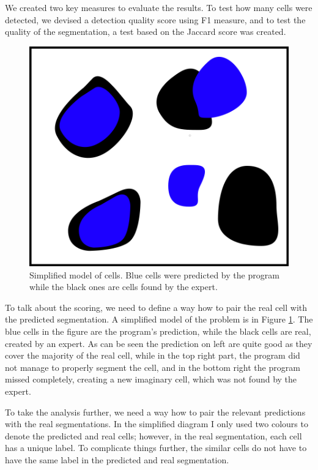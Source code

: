 \documentclass[
  digital,     %
  oneside,     %
  nosansbold,  %
  nocolorbold, %
  lof,         %
  lot,         %
]{fithesis4}
\begin{document}
We created two key measures to evaluate the results. To test how many cells were
detected, we devised a detection quality score using F1 measure, and to test the
quality of the segmentation, a test based on the Jaccard score was created.
\begin{figure}
    \begin{center}
        \includegraphics{resources/inkscape/evaluation.png}
    \end{center}
    \caption{Simplified model of cells. Blue cells were predicted by the program
    while the black ones are cells found by the expert.}
    \label{fig:evaluation_basic}
\end{figure}
To talk about the scoring, we need to define a way how to pair the real cell
with the predicted segmentation. A simplified model of the problem is in Figure
\ref{fig:evaluation_basic}. The blue cells in the figure are the program's
prediction, while the black cells are real, created by an expert. As can be seen
the prediction on left are quite good as they cover the majority of the real
cell, while in the top right part, the program did not manage to properly
segment the cell, and in the bottom right the program missed completely,
creating a new imaginary cell, which was not found by the expert.

To take the analysis further, we need a way how to pair the relevant predictions
with the real segmentations. In the simplified diagram I only used two colours
to denote the predicted and real cells; however, in the real segmentation, each
cell has a unique label. To complicate things further, the similar cells do not
have to have the same label in the predicted and real segmentation.
\end{document}
